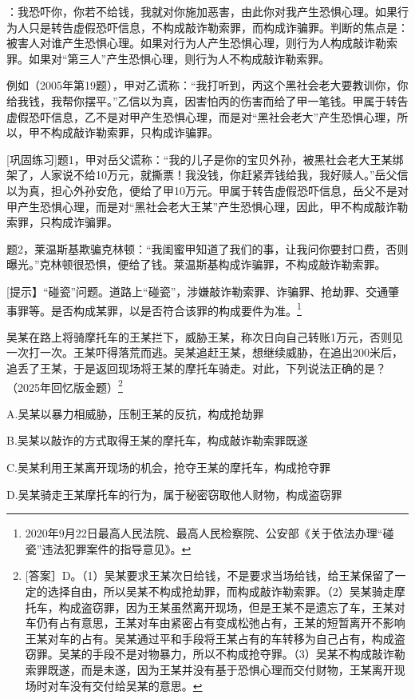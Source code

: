 ：我恐吓你，你若不给钱，我就对你施加恶害，由此你对我产生恐惧心理。如果行为人只是转告虚假恐吓信息，不构成敲诈勒索罪，而构成诈骗罪。判断的焦点是：被害人对谁产生恐惧心理。如果对行为人产生恐惧心理，则行为人构成敲诈勒索罪。如果对“第三人”产生恐惧心理，则行为人不构成敲诈勒索罪。

例如（2005年第19题），甲对乙谎称：“我打听到，丙这个黑社会老大要教训你，你给我钱，我帮你摆平。”乙信以为真，因害怕丙的伤害而给了甲一笔钱。甲属于转告虚假恐吓信息，乙不是对甲产生恐惧心理，而是对“黑社会老大”产生恐惧心理，所以，甲不构成敲诈勒索罪，只构成诈骗罪。

[巩固练习]题1，甲对岳父谎称：“我的儿子是你的宝贝外孙，被黑社会老大王某绑架了，人家说不给10万元，就撕票！我没钱，你赶紧弄钱给我，我好赎人。”岳父信以为真，担心外孙安危，便给了甲10万元。甲属于转告虚假恐吓信息，岳父不是对甲产生恐惧心理，而是对“黑社会老大王某”产生恐惧心理，因此，甲不构成敲诈勒索罪，只构成诈骗罪。

题2，莱温斯基欺骗克林顿：“我闺蜜甲知道了我们的事，让我问你要封口费，否则曝光。”克林顿很恐惧，便给了钱。莱温斯基构成诈骗罪，不构成敲诈勒索罪。

[提示】“碰瓷”问题。道路上“碰瓷”，涉嫌敲诈勒索罪、诈骗罪、抢劫罪、交通肇事罪等。是否构成某罪，以是否符合该罪的构成要件为准。\footnote{2020年9月22日最高人民法院、最高人民检察院、公安部《关于依法办理“碰瓷”违法犯罪案件的指导意见》。}


吴某在路上将骑摩托车的王某拦下，威胁王某，称次日向自己转账1万元，否则见一次打一次。王某吓得落荒而逃。吴某追赶王某，想继续威胁，在追出200米后，追丢了王某，于是返回现场将王某的摩托车骑走。对此，下列说法正确的是？（2025年回忆版金题）\footnote{[答案］D。（1）吴某要求王某次日给钱，不是要求当场给钱，给王某保留了一定的选择自由，所以吴某不构成抢劫罪，而构成敲诈勒索罪。（2）吴某骑走摩托车，构成盗窃罪，因为王某虽然离开现场，但是王某不是遗忘了车，王某对车仍有占有意思，王某对车由紧密占有变成松弛占有，王某的短暂离开不影响王某对车的占有。吴某通过平和手段将王某占有的车转移为自己占有，构成盗窃罪。吴某的手段不是对物暴力，所以不构成抢夺罪。（3）吴某不构成敲诈勒索罪既遂，而是未遂，因为王某并没有基于恐惧心理而交付财物，王某离开现场时对车没有交付给吴某的意思。}

A.吴某以暴力相威胁，压制王某的反抗，构成抢劫罪

B.吴某以敲诈的方式取得王某的摩托车，构成敲诈勒索罪既遂

C.吴某利用王某离开现场的机会，抢夺王某的摩托车，构成抢夺罪

D.吴某骑走王某摩托车的行为，属于秘密窃取他人财物，构成盗窃罪

